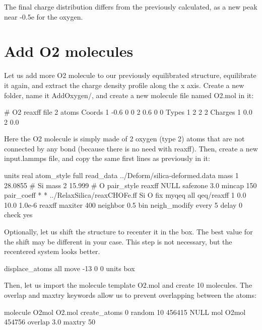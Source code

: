 The final charge distribution differs from the previously calculated, as a new peak 
near -0.5e for the oxygen. 

\section{Add O2 molecules}

\noindent Let us add more O2 molecule to our previously equilibrated structure, equilibrate it again, 
and extract the charge density profile along the x axis.
Create a new folder, name it AddOxygen/, and create a new molecule file named O2.mol in it:

\begin{lcverbatim}
# O2 reaxff file
2 atoms
Coords
1 -0.6 0 0
2 0.6 0 0
Types
1        2
2        2   
Charges 
1	0.0
2	0.0
\end{lcverbatim}

\noindent Here the O2 molecule is simply made of 2 oxygen (type 2) atoms that are not 
connected by any bond (because there is no need with reaxff).
Then, create a new input.lammps file, and copy the same first lines as
previously in it: 

\begin{lcverbatim}
units real
atom_style full
read_data ../Deform/silica-deformed.data
mass 1 28.0855 # Si
mass 2 15.999 # O
pair_style reaxff NULL safezone 3.0 mincap 150
pair_coeff * * ../RelaxSilica/reaxCHOFe.ff Si O
fix myqeq all qeq/reaxff 1 0.0 10.0 1.0e-6 reaxff maxiter 400
neighbor 0.5 bin
neigh_modify every 5 delay 0 check yes 
\end{lcverbatim}

\noindent Optionally, let us shift the structure to recenter it in the box. The best value 
for the shift may be different in your case. This step is not necessary, but the
recentered system looks better.

\begin{lcverbatim}
displace_atoms all move -13 0 0 units box
\end{lcverbatim}

\noindent Then, let us import the molecule template O2.mol and create 10 molecules. 
The overlap and maxtry keywords allow us to prevent overlapping
between the atoms:

\begin{lcverbatim}
molecule O2mol O2.mol
create_atoms 0 random 10 456415 NULL mol O2mol 454756 overlap 3.0 maxtry 50
\end{lcverbatim}

